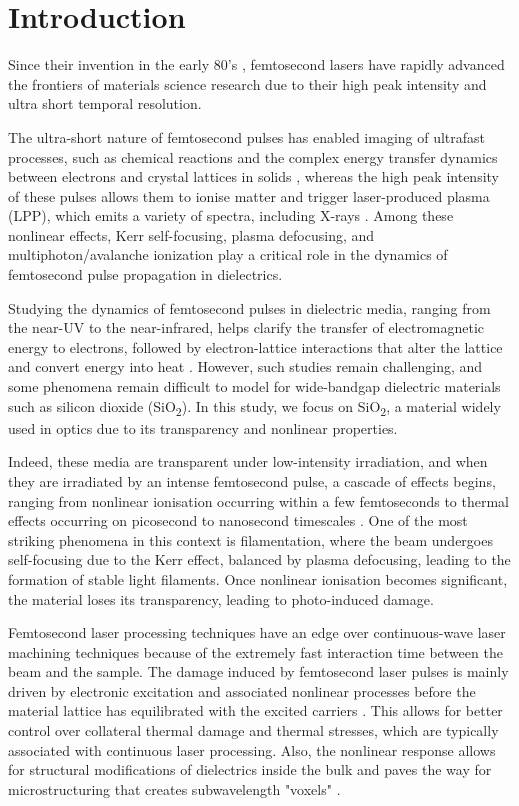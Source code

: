 \section{Introduction}

Since their invention in the early 80's \cite{fork1981}, femtosecond lasers have rapidly advanced the frontiers of materials science research due to their high peak intensity and ultra short temporal resolution.

The ultra-short nature of femtosecond pulses has enabled imaging of ultrafast processes, such as chemical reactions \cite{zewail1994} and the complex energy transfer dynamics between electrons and crystal lattices in solids \cite{shah1996}, whereas the high peak intensity of these pulses allows them to ionise matter and trigger laser-produced plasma (LPP), which emits a variety of spectra, including X-rays \cite{mao2004}. Among these nonlinear effects, Kerr self-focusing, plasma defocusing, and multiphoton/avalanche ionization play a critical role in the dynamics of femtosecond pulse propagation in dielectrics.

Studying the dynamics of femtosecond pulses in dielectric media, ranging from the near-UV to the near-infrared, helps clarify the transfer of electromagnetic energy to electrons, followed by electron-lattice interactions that alter the lattice and convert energy into heat \cite{mao2004}. However, such studies remain challenging, and some phenomena remain difficult to model for wide-bandgap dielectric materials such as silicon dioxide (SiO\textsubscript{2}). In this study, we focus on SiO\textsubscript{2}, a material widely used in optics due to its transparency and nonlinear properties.

Indeed, these media are transparent under low-intensity irradiation, and when they are irradiated by an intense femtosecond pulse, a cascade of effects begins, ranging from nonlinear ionisation occurring within a few femtoseconds to thermal effects occurring on picosecond to nanosecond timescales \cite{bulgakova2010}. One of the most striking phenomena in this context is filamentation, where the beam undergoes self-focusing due to the Kerr effect, balanced by plasma defocusing, leading to the formation of stable light filaments. Once nonlinear ionisation becomes significant, the material loses its transparency, leading to photo-induced damage.

Femtosecond laser processing techniques have an edge over continuous-wave laser machining techniques because of the extremely fast interaction time between the beam and the sample. The damage induced by femtosecond laser pulses is mainly driven by electronic excitation and associated nonlinear processes before the material lattice has equilibrated with the excited carriers \cite{mao2004}. This allows for better control over collateral thermal damage and thermal stresses, which are typically associated with continuous laser processing. Also, the nonlinear response allows for structural modifications of dielectrics inside the bulk and paves the way for microstructuring that creates subwavelength "voxels" \cite{mao2004}.

